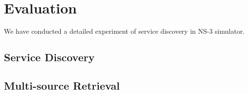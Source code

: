 \section{Evaluation}
We have conducted a detailed experiment of service discovery in NS-3 simulator.
\subsection{Service Discovery}
\subsection{Multi-source Retrieval}

